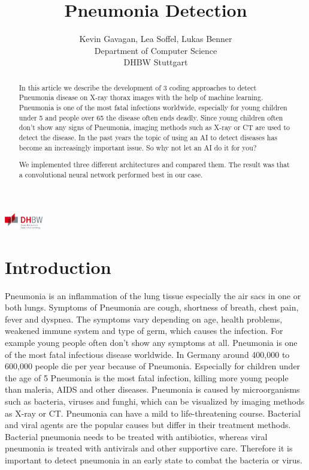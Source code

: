 \documentclass{article}
\title{Pneumonia Detection}
\author{
  Kevin Gavagan, Lea Soffel, Lukas Benner\\
  Department of Computer Science\\
  DHBW Stuttgart\\
}
\begin{document}
\begin{center}
\includegraphics[height=0.7cm]{images/dhbw_logo.png}
\end{center}

\maketitle

\begin{abstract}
In this article we describe the development of 3 coding approaches to detect Pneumonia disease on X-ray thorax images with the help of machine learning. 
Pneumonia is one of the most fatal infections worldwide, 
especially for young children under 5 and people over 65 the disease often ends deadly. 
Since young children often don't show any signs of Pneumonia, imaging methods such as X-ray or CT are used to detect the disease. 
In the past years the topic of using an AI to detect diseases has become an increasingly important issue. 
So why not let an AI do it for you?

We implemented three different architectures and compared them. 
The result was that a convolutional neural network performed best in our case.
\end{abstract}

\section{Introduction}	

Pneumonia is an inflammation of the lung tissue especially the air sacs in one or both lungs. 
Symptoms of Pneumonia are cough, shortness of breath, chest pain, fever and dyspnea. 
The symptoms vary depending on age, health problems, weakened immune system and type of germ, 
which causes the infection. For example young people often don't show any symptoms at all. 
Pneumonia is one of the most fatal infectious disease worldwide. 
In Germany around 400,000 to 600,000 people die per year because of Pneumonia. 
Especially for children under the age of 5 Pneumonia is the most fatal infection, 
killing more young people than maleria, AIDS and other diseases. 
Pneumonia is caused by microorganisms such as bacteria, viruses and funghi, 
which can be visualized by imaging methods as X-ray or CT. 
Pneumonia can have a mild to life-threatening course. 
Bacterial and viral agents are the popular causes but differ in their treatment methods. 
Bacterial pneumonia needs to be treated with antibiotics, 
whereas viral pneumonia is treated with antivirals and other supportive care. 
Therefore it is important to detect pneumonia in an early state to combat the bacteria or virus. 
\end{document}
